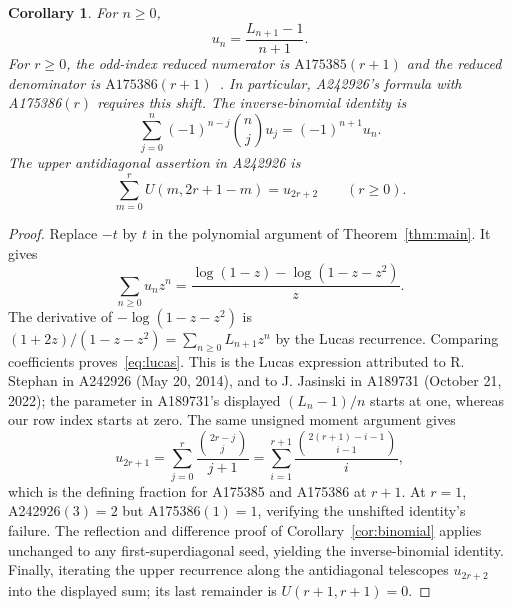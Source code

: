 \documentclass[11pt]{article}
\newtheorem{corollary}[theorem]{Corollary}
\begin{document}
\begin{corollary}\label{cor:unsigned}
For $n\ge0$,
\begin{equation}\label{eq:lucas}
 u_n=\frac{L_{n+1}-1}{n+1}.
\end{equation}
For $r\ge0$, the odd-index reduced numerator is $\mathrm{A175385}(r+1)$
and the reduced denominator is $\mathrm{A175386}(r+1)$~\cite{unsignedbisections}.
In particular, A242926's formula with A175386$(r)$ requires this shift.
The inverse-binomial identity is
\[
 \sum_{j=0}^n(-1)^{n-j}\binom nj u_j=(-1)^{n+1}u_n.
\]
The upper antidiagonal assertion in A242926 is
\[
 \sum_{m=0}^r U(m,2r+1-m)=u_{2r+2}\qquad(r\ge0).
\]
\end{corollary}
\begin{proof}
Replace $-t$ by $t$ in the polynomial argument of Theorem~\ref{thm:main}.
It gives
\[
 \sum_{n\ge0}u_nz^n=\frac{\log(1-z)-\log(1-z-z^2)}z.
\]
The derivative of $-\log(1-z-z^2)$ is
$(1+2z)/(1-z-z^2)=\sum_{n\ge0}L_{n+1}z^n$ by the Lucas recurrence.
Comparing coefficients proves~\eqref{eq:lucas}. This is the Lucas expression
attributed to R. Stephan in A242926 (May 20, 2014), and to J. Jasinski
in A189731 (October 21, 2022); the parameter in A189731's displayed
$(L_n-1)/n$ starts at one, whereas our row index starts at zero.
The same unsigned moment argument gives
\[
 u_{2r+1}=\sum_{j=0}^r\frac{\binom{2r-j}{j}}{j+1}
 =\sum_{i=1}^{r+1}\frac{\binom{2(r+1)-i-1}{i-1}}i,
\]
which is the defining fraction for A175385 and A175386 at $r+1$.
At $r=1$, A242926$(3)=2$ but A175386$(1)=1$, verifying the unshifted
identity's failure. The reflection and difference proof of
Corollary~\ref{cor:binomial} applies unchanged to any first-superdiagonal
seed, yielding the inverse-binomial identity.
Finally, iterating the upper recurrence along the antidiagonal telescopes
$u_{2r+2}$ into the displayed sum; its last remainder is
$U(r+1,r+1)=0$.
\end{proof}
\end{document}
